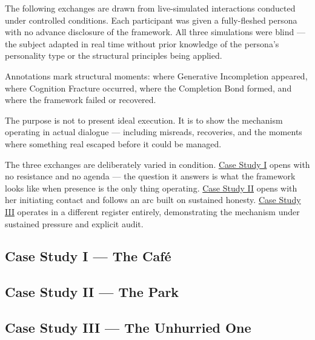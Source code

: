 The following exchanges are drawn from live-simulated interactions conducted under 
controlled conditions. Each participant was given a fully-fleshed persona with no 
advance disclosure of the framework. All three simulations were blind --- the subject 
adapted in real time without prior knowledge of the persona's personality type or the 
structural principles being applied.

Annotations mark structural moments: where Generative Incompletion appeared, 
where Cognition Fracture occurred, where the Completion Bond formed, and where the 
framework failed or recovered.

The purpose is not to present ideal execution. It is to show the mechanism 
operating in actual dialogue --- including misreads, recoveries, and the moments 
where something real escaped before it could be managed.

The three exchanges are deliberately varied in condition. 
\hyperref[subsec:case_study_1]{Case Study I} opens with no resistance and no agenda --- the 
question it answers is what the framework looks like when presence is the only thing operating. 
\hyperref[subsec:case_study_2]{Case Study II} opens with her initiating contact and follows an 
arc built on sustained honesty. 
\hyperref[subsec:case_study_3]{Case Study III} operates in a different register entirely, 
demonstrating the mechanism under sustained pressure and explicit audit.

\newpage
\subsection*{Case Study I --- The Caf\'{e}}\label{subsec:case_study_1}


\newpage
\subsection*{Case Study II --- The Park}\label{subsec:case_study_2}

\newpage
\subsection*{Case Study III --- The Unhurried One}\label{subsec:case_study_3}

